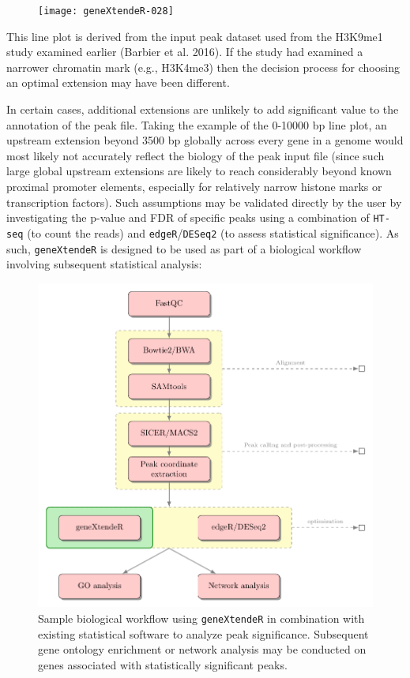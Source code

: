 \documentclass[12pt]{article}
\begin{document}
\begin{figure}[H]
\begin{center}
\texttt{[image: geneXtendeR-028]}
\end{center}
\end{figure}

This line plot is derived from the input peak dataset used from the H3K9me1 study examined earlier (Barbier et al. 2016).  If the study had examined a narrower chromatin mark (e.g., H3K4me3) then the decision process for choosing an optimal extension may have been different.  

In certain cases, additional extensions are unlikely to add significant value to the annotation of the peak file.  Taking the example of the 0-10000 bp line plot, an upstream extension beyond 3500 bp globally across every gene in a genome would most likely not accurately reflect the biology of the peak input file (since such large global upstream extensions are likely to reach considerably beyond known proximal promoter elements, especially for relatively narrow histone marks or transcription factors).  Such assumptions may be validated directly by the user by investigating the p-value and FDR of specific peaks using a combination of \texttt{HT-seq} (to count the reads) and \texttt{edgeR}/\texttt{DESeq2} (to assess statistical significance).  As such, \texttt{geneXtendeR} is designed to be used as part of a biological workflow involving subsequent statistical analysis:

\begin{figure}[H]
\centering
\includegraphics{figures/workflow.pdf}
\caption{Sample biological workflow using \texttt{geneXtendeR} in combination with existing statistical software to analyze peak significance.  Subsequent gene ontology enrichment or network analysis may be conducted on genes associated with statistically significant peaks.}
\end{figure}
\end{document}
